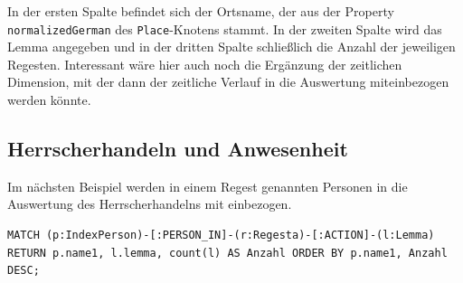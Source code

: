 \documentclass[ngerman,]{scrreprt}
\begin{document}
In der ersten Spalte befindet sich der Ortsname, der aus der Property \texttt{normalizedGerman} des \texttt{Place}-Knotens stammt. In der zweiten Spalte wird das Lemma angegeben und in der dritten Spalte schließlich die Anzahl der jeweiligen Regesten. Interessant wäre hier auch noch die Ergänzung der zeitlichen Dimension, mit der dann der zeitliche Verlauf in die Auswertung miteinbezogen werden könnte.

\subsection{Herrscherhandeln und Anwesenheit}\label{herrscherhandeln-und-anwesenheit}

Im nächsten Beispiel werden in einem Regest genannten Personen in die Auswertung des Herrscherhandelns mit einbezogen.

\begin{verbatim}
MATCH (p:IndexPerson)-[:PERSON_IN]-(r:Regesta)-[:ACTION]-(l:Lemma)
RETURN p.name1, l.lemma, count(l) AS Anzahl ORDER BY p.name1, Anzahl DESC;
\end{verbatim}
\end{document}
